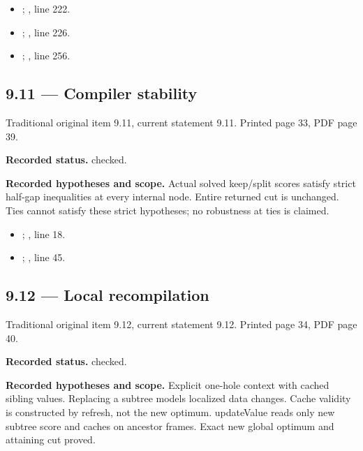 \begin{itemize}
\item {}; , line 222.
\item {}; , line 226.
\item {}; , line 256.
\end{itemize}
\subsection{9.11 — Compiler stability}
\label{result:9.11}
{\footnotesize\color{muted}Traditional original item 9.11, current statement 9.11. Printed page 33, PDF page 39.}\par
\textbf{Recorded status.} checked.

\textbf{Recorded hypotheses and scope.} Actual solved keep/split scores satisfy strict half-gap inequalities at every internal node. Entire returned cut is unchanged. Ties cannot satisfy these strict hypotheses; no robustness at ties is claimed.

\begin{itemize}
\item {}; , line 18.
\item {}; , line 45.
\end{itemize}
\subsection{9.12 — Local recompilation}
\label{result:9.12}
{\footnotesize\color{muted}Traditional original item 9.12, current statement 9.12. Printed page 34, PDF page 40.}\par
\textbf{Recorded status.} checked.

\textbf{Recorded hypotheses and scope.} Explicit one-hole context with cached sibling values. Replacing a subtree models localized data changes. Cache validity is constructed by refresh, not the new optimum. updateValue reads only new subtree score and caches on ancestor frames. Exact new global optimum and attaining cut proved.


